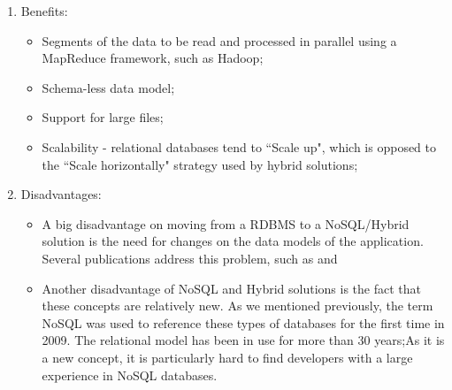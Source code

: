 \documentclass{article}
\begin{document}
\begin{enumerate}
    \item Benefits: 
\begin{itemize}
  \item Segments of the data to be read and processed in parallel using a MapReduce framework, such as Hadoop;
  \item Schema-less data model;
  \item Support for large files;
  \item Scalability - relational databases tend to ``Scale up", which is opposed to the ``Scale horizontally" strategy used by hybrid solutions;
\end{itemize}

    \item Disadvantages:
    \begin{itemize}
    \item A big disadvantage on moving from a RDBMS to a NoSQL/Hybrid solution is the need for changes on the data models of the application. Several publications address this problem, such as \cite{Schram:2012:MND:2384716.2384773} \cite{Cattell:2011:SSN:1978915.1978919} and \cite{Mohan:2013:HRI:2452376.2452378}
    \item Another disadvantage of NoSQL and Hybrid solutions is the fact that these concepts are relatively new. As we mentioned previously, the term NoSQL was used to reference these types of databases for the first time in 2009\cite{ericevans}. The relational model has been in use for more than 30 years;As it is a new concept, it is particularly hard to find developers with a large experience in NoSQL databases.
\end{itemize}
    

\end{enumerate}
\end{document}
